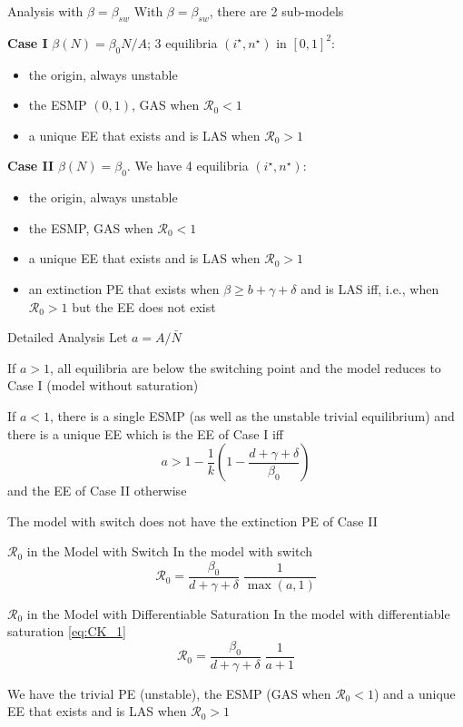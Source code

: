 \documentclass[aspectratio=169]{beamer}\usepackage[]{graphicx}\usepackage[]{xcolor}
\begin{document}
\begin{frame}{Analysis with $\beta = \beta_{sw}$}
\bbullet With $\beta = \beta_{sw}$, there are 2 sub-models

\bbullet \textbf{Case I} $\beta(N) = \beta_0N/A$; 3 equilibria $(i^{\star},n^{\star})$ in $[0,1]^2$: 
\begin{itemize}
\item the origin, always unstable
\item the ESMP $(0, 1)$, GAS when $\mathcal{R}_0 < 1$
\item a unique EE that exists and is LAS when $\mathcal{R}_0 > 1$
\end{itemize}

\bbullet \textbf{Case II} $\beta(N) = \beta_0$. We have 4 equilibria $(i^{\star},n^{\star})$: 
\begin{itemize}
\item the origin, always unstable
\item the ESMP, GAS when $\mathcal{R}_0 < 1$
\item a unique EE that exists and is LAS when $\mathcal{R}_0 > 1$
\item an extinction PE that exists when $\beta\geq b+\gamma+\delta$ and is LAS iff, i.e., when $\mathcal{R}_0 > 1$ but the EE does not exist
\end{itemize}
\end{frame}

\begin{frame}{Detailed Analysis}
\bbullet Let $a=A/\bar{N}$

\bbullet If $a>1$, all equilibria are below the switching point and the model reduces to Case I (model without saturation)

\bbullet If $a<1$, there is a single ESMP (as well as the unstable trivial equilibrium) and there is a unique EE which is the EE of Case I iff 
\[
a>1-\frac{1}{k}\left(1-\frac{d+\gamma+\delta}{\beta_0}\right)
\]
and the EE of Case II otherwise

\bbullet The model with switch does not have the extinction PE of Case II
\end{frame}

\begin{frame}{$\mathcal{R}_0$ in the Model with Switch}
\bbullet In the model with switch
\[
\mathcal{R}_0
=\frac{\beta_0}{d+\gamma+\delta}
\;
\frac{1}{\max(a,1)}
\]
\end{frame}

\begin{frame}{$\mathcal{R}_0$ in the Model with Differentiable Saturation}
\bbullet In the model with differentiable saturation \eqref{eq:CK_1}
\[
\mathcal{R}_0
=\frac{\beta_0}{d+\gamma+\delta}
\;
\frac{1}{a+1}
\]

\bbullet We have the trivial PE (unstable), the ESMP (GAS when $\mathcal{R}_0<1$) and a unique EE that exists and is LAS when $\mathcal{R}_0>1$
\end{frame}
\end{document}
